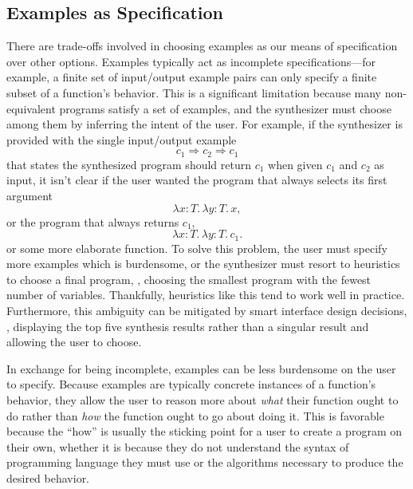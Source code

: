 \subsection{Examples as Specification}
\label{subsec:examples-as-specification}

There are trade-offs involved in choosing examples as our means of specification over other options.
Examples typically act as incomplete specifications---for example, a finite set of input/output example pairs can only specify a finite subset of a function's behavior.
This is a significant limitation because many non-equivalent programs satisfy a set of examples, and the synthesizer must choose among them by inferring the intent of the user.
For example, if the synthesizer is provided with the single input/output example
\[
  c_1 ⇒ c_2 ⇒ c_1
\]
that states the synthesized program should return $c_1$ when given $c_1$ and $c_2$ as input, it isn't clear if the user wanted the program that always selects its first argument
\[
  λx{:}T.\,λy{:}T.\,x,
\]
or the program that always returns $c_1$,
\[
  λx{:}T.\,λy{:}T.\,c_1.
\]
or some more elaborate function.
To solve this problem, the user must specify more examples which is burdensome, or the synthesizer must resort to heuristics to choose a final program, \eg, choosing the smallest program with the fewest number of variables.
Thankfully, heuristics like this tend to work well in practice.
Furthermore, this ambiguity can be mitigated by smart interface design decisions, \eg, displaying the top five synthesis results rather than a singular result and allowing the user to choose.

In exchange for being incomplete, examples can be less burdensome on the user to specify.
Because examples are typically concrete instances of a function's behavior, they allow the user to reason more about \emph{what} their function ought to do rather than \emph{how} the function ought to go about doing it.
This is favorable because the ``how'' is usually the sticking point for a user to create a program on their own, whether it is because they do not understand the syntax of programming language they must use or the algorithms necessary to produce the desired behavior.

